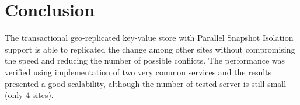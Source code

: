\documentclass[a4paper]{article}
\begin{document}

\section{Conclusion}

The transactional geo-replicated key-value store with Parallel Snapshot Isolation support is able to replicated the change among other sites without compromising the speed and reducing the number of possible conflicts. The performance was verified using implementation of two very common services and the results presented a good scalability, although the number of tested server is still small (only 4 sites).  
\end{document}
